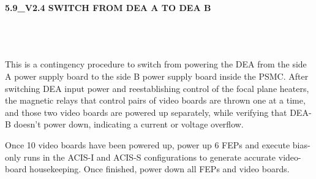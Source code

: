\documentclass[11pt]{article}
\begin{document}
\newcommand{\be}{\begin{enumerate}}
\newcommand{\ee}{\end{enumerate}}
\newcommand{\bc}{\begin{center}}
\newcommand{\ec}{\end{center}}
\newcommand{\bi}{\begin{itemize}}
\newcommand{\ei}{\end{itemize}}
\newcommand{\bd}{\begin{description}}
\newcommand{\ed}{\end{description}}
\newcommand{\bt}{\begin{tabbing}}
\newcommand{\et}{\end{tabbing}}
\newcommand{\eg}{{\it e.g.~}}
\newcommand{\ie}{{\it i.e.~}}
\newcommand{\ul}{\underline}
\newcommand{\axaf}{{\em AXAF}}
\def\la{\hbox{\rlap{$<$}\lower0.5ex\hbox{$\sim$}\ }}

\centerline{\large {\bf 5.9\_V2.4 SWITCH FROM DEA A TO DEA B }}
\vspace{0.25in}

\\
 \\


\\

This is a contingency procedure to switch from powering the DEA 
from the side A power supply board to the side B power supply board inside 
the PSMC. After switching DEA input power and reestablishing control of the
focal plane heaters, the magnetic relays that control pairs of video boards 
are thrown one at a time, and those two video boards are powered up separately,
while verifying that DEA-B doesn't power down, indicating a current or voltage 
overflow.

Once 10 video boards have been powered up, power up 6 FEPs and execute bias-only 
runs in the ACIS-I and ACIS-S configurations to generate accurate video-board 
housekeeping. Once finished, power down all FEPs and video boards.

\vspace{0.15in}
\end{document}
